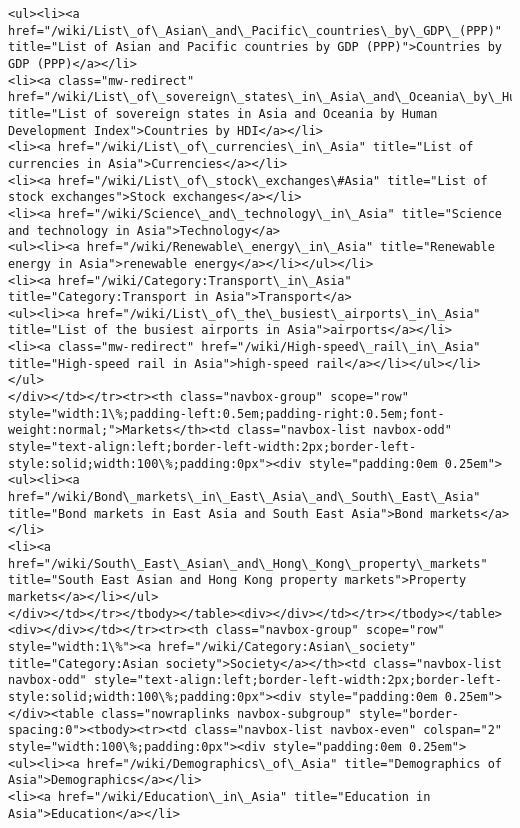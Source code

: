 \documentclass[11pt]{article}
\begin{document}
\begin{Verbatim}[commandchars=\\\{\}]
<ul><li><a href="/wiki/List\_of\_Asian\_and\_Pacific\_countries\_by\_GDP\_(PPP)" title="List of Asian and Pacific countries by GDP (PPP)">Countries by GDP (PPP)</a></li>
<li><a class="mw-redirect" href="/wiki/List\_of\_sovereign\_states\_in\_Asia\_and\_Oceania\_by\_Human\_Development\_Index" title="List of sovereign states in Asia and Oceania by Human Development Index">Countries by HDI</a></li>
<li><a href="/wiki/List\_of\_currencies\_in\_Asia" title="List of currencies in Asia">Currencies</a></li>
<li><a href="/wiki/List\_of\_stock\_exchanges\#Asia" title="List of stock exchanges">Stock exchanges</a></li>
<li><a href="/wiki/Science\_and\_technology\_in\_Asia" title="Science and technology in Asia">Technology</a>
<ul><li><a href="/wiki/Renewable\_energy\_in\_Asia" title="Renewable energy in Asia">renewable energy</a></li></ul></li>
<li><a href="/wiki/Category:Transport\_in\_Asia" title="Category:Transport in Asia">Transport</a>
<ul><li><a href="/wiki/List\_of\_the\_busiest\_airports\_in\_Asia" title="List of the busiest airports in Asia">airports</a></li>
<li><a class="mw-redirect" href="/wiki/High-speed\_rail\_in\_Asia" title="High-speed rail in Asia">high-speed rail</a></li></ul></li></ul>
</div></td></tr><tr><th class="navbox-group" scope="row" style="width:1\%;padding-left:0.5em;padding-right:0.5em;font-weight:normal;">Markets</th><td class="navbox-list navbox-odd" style="text-align:left;border-left-width:2px;border-left-style:solid;width:100\%;padding:0px"><div style="padding:0em 0.25em">
<ul><li><a href="/wiki/Bond\_markets\_in\_East\_Asia\_and\_South\_East\_Asia" title="Bond markets in East Asia and South East Asia">Bond markets</a></li>
<li><a href="/wiki/South\_East\_Asian\_and\_Hong\_Kong\_property\_markets" title="South East Asian and Hong Kong property markets">Property markets</a></li></ul>
</div></td></tr></tbody></table><div></div></td></tr></tbody></table><div></div></td></tr><tr><th class="navbox-group" scope="row" style="width:1\%"><a href="/wiki/Category:Asian\_society" title="Category:Asian society">Society</a></th><td class="navbox-list navbox-odd" style="text-align:left;border-left-width:2px;border-left-style:solid;width:100\%;padding:0px"><div style="padding:0em 0.25em"></div><table class="nowraplinks navbox-subgroup" style="border-spacing:0"><tbody><tr><td class="navbox-list navbox-even" colspan="2" style="width:100\%;padding:0px"><div style="padding:0em 0.25em">
<ul><li><a href="/wiki/Demographics\_of\_Asia" title="Demographics of Asia">Demographics</a></li>
<li><a href="/wiki/Education\_in\_Asia" title="Education in Asia">Education</a></li>

\end{Verbatim}
\end{document}
